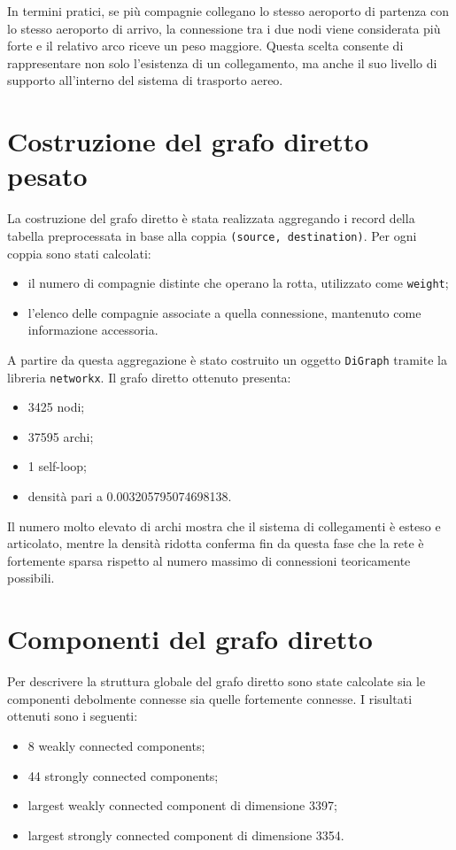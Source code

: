 In termini pratici, se più compagnie collegano lo stesso aeroporto di partenza con lo stesso aeroporto di arrivo, la connessione tra i due nodi viene considerata più forte e il relativo arco riceve un peso maggiore. Questa scelta consente di rappresentare non solo l’esistenza di un collegamento, ma anche il suo livello di supporto all’interno del sistema di trasporto aereo.

\section{Costruzione del grafo diretto pesato}

La costruzione del grafo diretto è stata realizzata aggregando i record della tabella preprocessata in base alla coppia \texttt{(source, destination)}. Per ogni coppia sono stati calcolati:
\begin{itemize}
    \item il numero di compagnie distinte che operano la rotta, utilizzato come \texttt{weight};
    \item l’elenco delle compagnie associate a quella connessione, mantenuto come informazione accessoria.
\end{itemize}

A partire da questa aggregazione è stato costruito un oggetto \texttt{DiGraph} tramite la libreria \texttt{networkx}. Il grafo diretto ottenuto presenta:
\begin{itemize}
    \item 3425 nodi;
    \item 37595 archi;
    \item 1 self-loop;
    \item densità pari a 0.003205795074698138.
\end{itemize}

Il numero molto elevato di archi mostra che il sistema di collegamenti è esteso e articolato, mentre la densità ridotta conferma fin da questa fase che la rete è fortemente sparsa rispetto al numero massimo di connessioni teoricamente possibili.

\section{Componenti del grafo diretto}

Per descrivere la struttura globale del grafo diretto sono state calcolate sia le componenti debolmente connesse sia quelle fortemente connesse. I risultati ottenuti sono i seguenti:
\begin{itemize}
    \item 8 weakly connected components;
    \item 44 strongly connected components;
    \item largest weakly connected component di dimensione 3397;
    \item largest strongly connected component di dimensione 3354.
\end{itemize}

